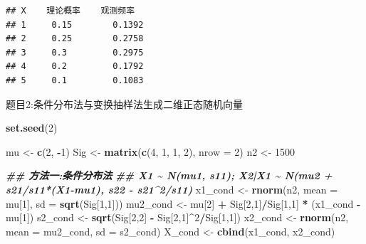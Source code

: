 \documentclass[
]{article}
\newenvironment{Shaded}{\begin{snugshade}}{\end{snugshade}}
\newcommand{\AttributeTok}[1]{\textcolor[rgb]{0.13,0.29,0.53}{#1}}
\newcommand{\DecValTok}[1]{\textcolor[rgb]{0.00,0.00,0.81}{#1}}
\newcommand{\DocumentationTok}[1]{\textcolor[rgb]{0.56,0.35,0.01}{\textbf{\textit{#1}}}}
\newcommand{\FunctionTok}[1]{\textcolor[rgb]{0.13,0.29,0.53}{\textbf{#1}}}
\newcommand{\NormalTok}[1]{#1}
\newcommand{\OtherTok}[1]{\textcolor[rgb]{0.56,0.35,0.01}{#1}}
\newcommand{\SpecialCharTok}[1]{\textcolor[rgb]{0.81,0.36,0.00}{\textbf{#1}}}
\begin{document}
\begin{verbatim}
## X    理论概率    观测频率
## 1     0.15        0.1392 
## 2     0.25        0.2758 
## 3     0.3         0.2975 
## 4     0.2         0.1792 
## 5     0.1         0.1083
\end{verbatim}

题目2:条件分布法与变换抽样法生成二维正态随机向量

\begin{Shaded}
\begin{Highlighting}[]
\FunctionTok{set.seed}\NormalTok{(}\DecValTok{2}\NormalTok{)}

\NormalTok{mu  }\OtherTok{\textless{}{-}} \FunctionTok{c}\NormalTok{(}\DecValTok{2}\NormalTok{, }\SpecialCharTok{{-}}\DecValTok{1}\NormalTok{)}
\NormalTok{Sig }\OtherTok{\textless{}{-}} \FunctionTok{matrix}\NormalTok{(}\FunctionTok{c}\NormalTok{(}\DecValTok{4}\NormalTok{, }\DecValTok{1}\NormalTok{, }\DecValTok{1}\NormalTok{, }\DecValTok{2}\NormalTok{), }\AttributeTok{nrow =} \DecValTok{2}\NormalTok{)}
\NormalTok{n2  }\OtherTok{\textless{}{-}} \DecValTok{1500}

\DocumentationTok{\#\# 方法一:条件分布法}
\DocumentationTok{\#\# X1 \textasciitilde{} N(mu1, s11);  X2|X1 \textasciitilde{} N(mu2 + s21/s11*(X1{-}mu1), s22 {-} s21\^{}2/s11)}
\NormalTok{x1\_cond }\OtherTok{\textless{}{-}} \FunctionTok{rnorm}\NormalTok{(n2, }\AttributeTok{mean =}\NormalTok{ mu[}\DecValTok{1}\NormalTok{], }\AttributeTok{sd =} \FunctionTok{sqrt}\NormalTok{(Sig[}\DecValTok{1}\NormalTok{,}\DecValTok{1}\NormalTok{]))}
\NormalTok{mu2\_cond }\OtherTok{\textless{}{-}}\NormalTok{ mu[}\DecValTok{2}\NormalTok{] }\SpecialCharTok{+}\NormalTok{ Sig[}\DecValTok{2}\NormalTok{,}\DecValTok{1}\NormalTok{]}\SpecialCharTok{/}\NormalTok{Sig[}\DecValTok{1}\NormalTok{,}\DecValTok{1}\NormalTok{] }\SpecialCharTok{*}\NormalTok{ (x1\_cond }\SpecialCharTok{{-}}\NormalTok{ mu[}\DecValTok{1}\NormalTok{])}
\NormalTok{s2\_cond  }\OtherTok{\textless{}{-}} \FunctionTok{sqrt}\NormalTok{(Sig[}\DecValTok{2}\NormalTok{,}\DecValTok{2}\NormalTok{] }\SpecialCharTok{{-}}\NormalTok{ Sig[}\DecValTok{2}\NormalTok{,}\DecValTok{1}\NormalTok{]}\SpecialCharTok{\^{}}\DecValTok{2}\SpecialCharTok{/}\NormalTok{Sig[}\DecValTok{1}\NormalTok{,}\DecValTok{1}\NormalTok{])}
\NormalTok{x2\_cond  }\OtherTok{\textless{}{-}} \FunctionTok{rnorm}\NormalTok{(n2, }\AttributeTok{mean =}\NormalTok{ mu2\_cond, }\AttributeTok{sd =}\NormalTok{ s2\_cond)}
\NormalTok{X\_cond   }\OtherTok{\textless{}{-}} \FunctionTok{cbind}\NormalTok{(x1\_cond, x2\_cond)}


\end{Highlighting}
\end{Shaded}
\end{document}
